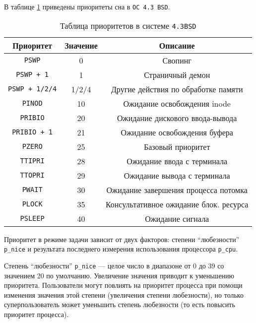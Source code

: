 В таблице \ref{tab:bsd} приведены приоритеты сна в \texttt{ОС 4.3 BSD}.

\begin{table}[h]
    \caption{Таблица приоритетов в системе \texttt{4.3BSD}}
    \label{tab:bsd}
    \begin{center}
        \begin{tabular}{ |c|c|c| }
            \hline
            \textbf{Приоритет} & \textbf{Значение} & \textbf{Описание} \\
            \hline
            \texttt{PSWP} & 0 & Свопинг \\
            \hline
            \texttt{PSWP + 1} & 1 & Страничный демон \\
            \hline
            \texttt{PSWP + 1/2/4} & 1/2/4 & Другие действия по обработке памяти \\
            \hline
            \texttt{PINOD} & 10 & Ожидание освобождения inode \\
            \hline
            \texttt{PRIBIO} & 20 & Ожидание дискового ввода-вывода \\
            \hline
            \texttt{PRIBIO + 1} & 21 & Ожидание освобождения буфера \\
            \hline
            \texttt{PZERO} & 25 & Базовый приоритет \\
            \hline
            \texttt{TTIPRI} & 28 & Ожидание ввода с терминала \\
            \hline
            \texttt{TTOPRI} & 29 & Ожидание вывода с терминала \\
            \hline
            \texttt{PWAIT} & 30 & Ожидание завершения процесса потомка \\
            \hline
            \texttt{PLOCK} & 35 & Консультативное ожидание блок. ресурса \\
            \hline
            \texttt{PSLEEP} & 40 & Ожидание сигнала \\
            \hline
        \end{tabular}
    \end{center}
\end{table}

Приоритет в режиме задачи зависит от двух факторов: степени ``любезности'' \texttt{p\_nice} и результата последнего измерения использования процессора \texttt{p\_cpu}.

Степень ``любезности'' \texttt{p\_nice} --- целое число в диапазоне от 0 до 39 со значением 20 по умолчанию. Увеличение значения приводит к уменьшению приоритета. Пользователи могут повлиять на приоритет процесса при помощи изменения значения этой степени (увеличения степени любезности), но только суперпользователь может уменьшить степень любезности (то есть повысить приоритет процесса).

